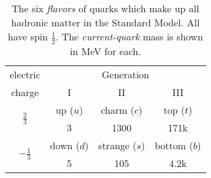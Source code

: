 \begin{table}
\begin{minipage}{\textwidth}
\begin{center}
\begin{singlespacing}

\caption[Quarks in the Standard Model]{\label{tab:quarks}The six \emph{flavors} of quarks which make up all hadronic matter in the Standard Model. All have spin $\frac{1}{2}$. The \emph{current-quark} mass is shown in MeV for each\cite{pdg}.}

\begin{tabular}{c|ccc}

\hline \hline

electric & \multicolumn{3}{c}{Generation} \\
charge & I & II & III \\


\hline

\multirow{2}{*}{$\frac{2}{3}$} & up ($u$) & charm ($c$) & top ($t$) \\
 & 3 & 1300 & 171k \\

\hline

\multirow{2}{*}{$-\frac{1}{3}$} & down ($d$) & strange ($s$) & bottom ($b$) \\
 & 5 & 105 & 4.2k \\

\hline \hline

\end{tabular}

\end{singlespacing}
\end{center}
\end{minipage}
\end{table}
\vspace{20pt}